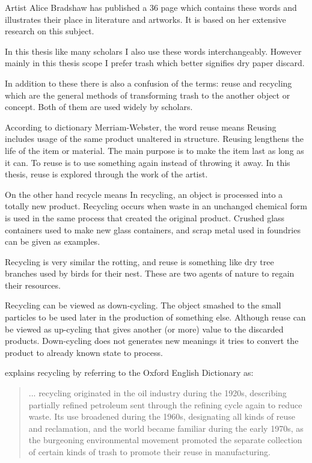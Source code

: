 Artist Alice Bradshaw has published a 36 page  which contains these words and illustrates their place in literature and artworks. It is based on her extensive research on this subject.

In this thesis like many scholars I also use these words interchangeably. However mainly in this thesis scope I prefer trash which better signifies dry paper discard.

In addition to these there is also a confusion of the terms: reuse and recycling which are the general methods of transforming trash to the another object or concept. Both of them are used widely by scholars.

According to dictionary Merriam-Webster, the word reuse means  Reusing includes usage of the same product unaltered in structure. Reusing lengthens the life of the item or material. The main purpose is to make the item last as long as it can. To reuse is to use something again instead of throwing it away. In this thesis, reuse is explored through the work of the artist.

On the other hand recycle means  In recycling, an object is processed into a totally new product. Recycling occurs when waste in an unchanged chemical form is used in the same process that created the original product. Crushed glass containers used to make new glass containers, and scrap metal used in foundries can be given as examples.

Recycling is very similar the rotting, and reuse is something like dry tree branches used by birds for their nest. These are two agents of nature to regain their resources.

Recycling can be viewed as down-cycling. The object smashed to the small particles to be used later in the production of something else. Although reuse can be viewed as up-cycling that gives another (or more) value to the discarded products. Down-cycling does not generates new meanings it tries to convert the product to already known state to process. 

\cite[72]{strasser1999waste} explains recycling by referring to the Oxford English Dictionary as:
\begin{quote}
... recycling originated in the oil industry during the 1920s, describing partially refined petroleum sent through the refining cycle again to reduce waste. Its use broadened during the 1960s, designating all kinds of reuse and reclamation, and the world became familiar during the early 1970s, as the burgeoning environmental movement promoted the separate collection of certain kinds of trash to promote their reuse in manufacturing.
\end{quote}

